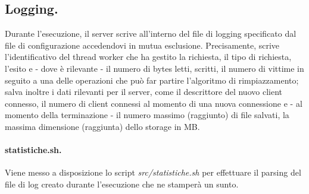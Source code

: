 \documentclass[11pt, italian, openany]{book}
\begin{document}
\begin{sloppypar}
\subsection{Logging.}
Durante l'esecuzione, il server scrive all'interno del file di logging specificato dal file di configurazione accedendovi in mutua
esclusione. Precisamente, scrive l'identificativo del thread worker che ha gestito la richiesta, il tipo di richiesta, l'esito e -
dove \`e rilevante - il numero di bytes letti, scritti, il numero di vittime in seguito a una delle operazioni che pu\`o far
partire l'algoritmo di rimpiazzamento; salva inoltre i dati rilevanti per il server, come il descrittore del nuovo client
connesso, il numero di client connessi al momento di una nuova connessione e - al momento della terminazione - il numero
massimo (raggiunto) di file salvati, la massima dimensione (raggiunta) dello storage in MB.

\paragraph*{statistiche.sh.}
Viene messo a disposizione lo script \textit{src/statistiche.sh} per effettuare il parsing del file di log creato durante
l'esecuzione che ne stamper\`a un sunto.

\pagebreak
\end{sloppypar}
\end{document}
